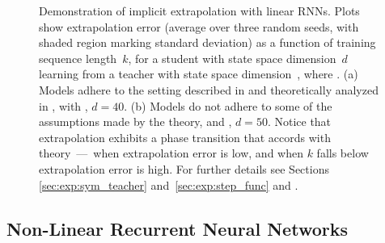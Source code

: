 \begin{figure}[H]
    \centering
    \caption{
    Demonstration of implicit extrapolation with linear RNNs.
    Plots show extrapolation error (average over three random seeds, with shaded region marking standard deviation) as a function of training sequence length~$k$, for a student with state space dimension~$d$ learning from a teacher with state space dimension~, where .
    (a) Models adhere to the setting described in  and theoretically analyzed in , with , $d = 40$.
    (b) Models do not adhere to some of the assumptions made by the theory, and , $d = 50$.
    Notice that extrapolation exhibits a phase transition that accords with theory~---~when  extrapolation error is low, and when $k$ falls below~ extrapolation error is high.
    For further details see Sections \ref{sec:exp:sym_teacher} and~\ref{sec:exp:step_func} and .
    }
    \label{fig:phase_transition_v2}
\end{figure}

\subsection{Non-Linear Recurrent Neural Networks} \label{sec:exp:non_linear_teacher}

